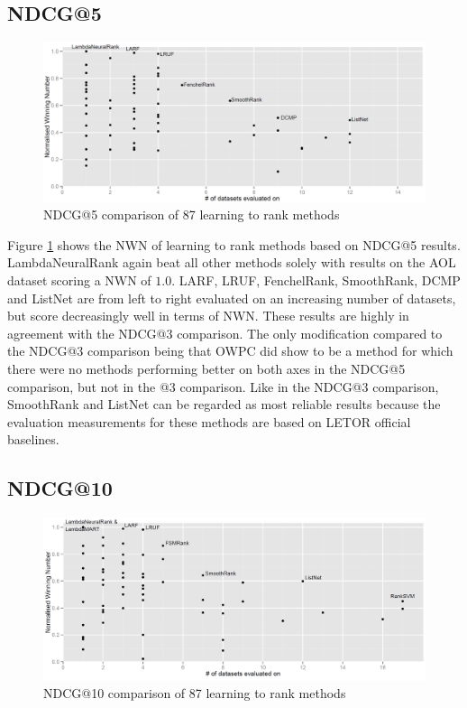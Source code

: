 \documentclass[english, authoryear, preprint]{elsarticle}
\begin{document}
\subsection{NDCG@5}
\begin{figure}
\centering
\includegraphics[scale=0.26]{gfx/ndcg5_winnum}
\caption{NDCG@5 comparison of 87 learning to rank methods}
\label{fig:normalized_winning_number_ndcg5}
\end{figure}
Figure \ref{fig:normalized_winning_number_ndcg5} shows the NWN of learning to rank methods based on NDCG@5 results. LambdaNeuralRank again beat all other methods solely with results on the AOL dataset scoring a NWN of $1.0$. LARF, LRUF, FenchelRank, SmoothRank, DCMP and ListNet are from left to right evaluated on an increasing number of datasets, but score decreasingly well in terms of NWN. These results are highly in agreement with the NDCG@3 comparison. The only modification compared to the NDCG@3 comparison being that OWPC did show to be a method for which there were no methods performing better on both axes in the NDCG@5 comparison, but not in the @3 comparison. Like in the NDCG@3 comparison, SmoothRank and ListNet can be regarded as most reliable results because the evaluation measurements for these methods are based on LETOR official baselines.

\subsection{NDCG@10}
\begin{figure}
\centering
\includegraphics[scale=0.26]{gfx/ndcg10_winnum}
\caption{NDCG@10 comparison of 87 learning to rank methods}
\label{fig:normalized_winning_number_ndcg10}
\end{figure}
\end{document}
